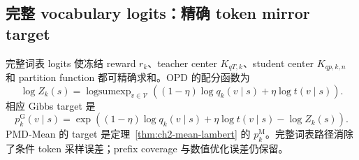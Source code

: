 \documentclass[lang=cn,scheme=chinese,openany]{../book/elegantbook}
\begin{document}
\subsection{完整 vocabulary logits：精确 token mirror target}
\label{sec:ch2-opd-full-vocab}

完整词表 logits 使冻结 reward $r_k$、teacher center $K_{qT,k}$、student center $K_{qp,k,n}$ 和 partition function 都可精确求和。OPD 的配分函数为
\begin{equation}
\log Z_k(s)=\operatorname{logsumexp}_{v\in\mathcal V}
\left((1-\eta)\log q_k(v\mid s)+\eta\log t(v\mid s)\right).
\label{eq:ch2-opd-full-logz}
\end{equation}
相应 Gibbs target 是
\begin{equation}
p_k^{\mathrm G}(v\mid s)
=\exp\!\left((1-\eta)\log q_k(v\mid s)+\eta\log t(v\mid s)-\log Z_k(s)\right).
\end{equation}
PMD-Mean 的 target 是定理~\ref{thm:ch2-mean-lambert} 的 $p_k^{\mathrm M}$。完整词表路径消除了条件 token 采样误差；prefix coverage 与数值优化误差仍保留。
\end{document}
